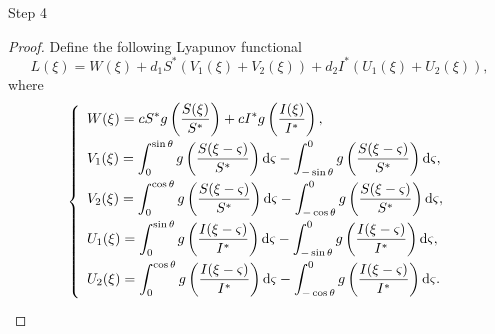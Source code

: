\documentclass[final,3p,times]{elsarticle}
\numberwithin{equation}{section}
\def\d {{\rm d}}
\begin{document}
Step 4
\begin{proof}
Define the following Lyapunov functional
\[
L(\xi) = W(\xi) + d_1 S^*(V_1(\xi)+V_2(\xi)) + d_2 I^* (U_1(\xi)+U_2(\xi)),
\]
where
\[
\left\{
\begin{array}{l}
\vspace{1mm}
\displaystyle   W(\xi) = cS^* g\left(\frac{S(\xi)}{S^*}\right) + cI^* g\left(\frac{I(\xi)}{I^*}\right),\\
\vspace{1mm}
\displaystyle   V_1(\xi) = \int_0^{\sin\theta} g\left(\frac{S(\xi-\varsigma)}{S^*}\right)\d \varsigma - \int_{-\sin\theta}^0 g\left(\frac{S(\xi-\varsigma)}{S^*}\right)\d \varsigma,\\
\vspace{1mm}
\displaystyle   V_2(\xi) = \int_0^{\cos\theta} g\left(\frac{S(\xi-\varsigma)}{S^*}\right)\d \varsigma - \int_{-\cos\theta}^0 g\left(\frac{S(\xi-\varsigma)}{S^*}\right)\d \varsigma,\\
\vspace{1mm}
\displaystyle   U_1(\xi) = \int_0^{\sin\theta} g\left(\frac{I(\xi-\varsigma)}{I^*}\right)\d \varsigma - \int_{-\sin\theta}^0 g\left(\frac{I(\xi-\varsigma)}{I^*}\right)\d \varsigma,\\
\vspace{1mm}
\displaystyle   U_2(\xi) = \int_0^{\cos\theta} g\left(\frac{I(\xi-\varsigma)}{I^*}\right)\d \varsigma - \int_{-\cos\theta}^0 g\left(\frac{I(\xi-\varsigma)}{I^*}\right)\d \varsigma.
\end{array}\right.
\]


\end{proof}
\end{document}
